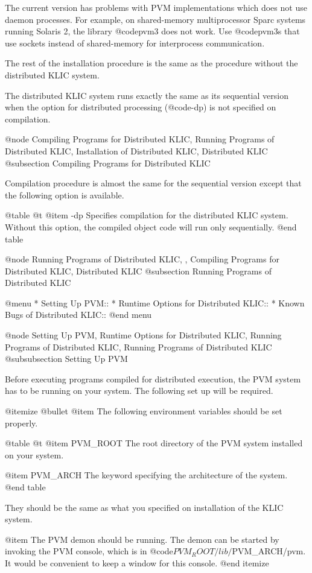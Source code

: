 {{{{The current version has problems with PVM implementations which does not
use daemon processes.  For example, on shared-memory multiprocessor
Sparc systems running Solaris 2, the library @code{pvm3} does not work.
Use @code{pvm3s} that use sockets instead of shared-memory for
interprocess communication.

The rest of the installation procedure is the same as the procedure
without the distributed KLIC system.

The distributed KLIC system runs exactly the same as its sequential
version when the option for distributed processing (@code{-dp}) is not
specified on compilation.

@node Compiling Programs for Distributed KLIC, Running Programs of Distributed KLIC, Installation of Distributed KLIC, Distributed KLIC
@subsection Compiling Programs for Distributed KLIC

Compilation procedure is almost the same for the sequential version
except that the following option is available.

@table @t
@item -dp
Specifies compilation for the distributed KLIC system.  Without this
option, the compiled object code will run only sequentially.
@end table

@node Running Programs of Distributed KLIC,  , Compiling Programs for Distributed KLIC, Distributed KLIC
@subsection Running Programs of Distributed KLIC

@menu
* Setting Up PVM::              
* Runtime Options for Distributed KLIC::  
* Known Bugs of Distributed KLIC::  
@end menu

@node Setting Up PVM, Runtime Options for Distributed KLIC, Running Programs of Distributed KLIC, Running Programs of Distributed KLIC
@subsubsection Setting Up PVM

Before executing programs compiled for distributed execution, the PVM
system has to be running on your system.  The following set up will be
required.

@itemize @bullet
@item
The following environment variables should be set properly.

@table @t
@item PVM_ROOT
The root directory of the PVM system installed on your system.

@item PVM_ARCH
The keyword specifying the architecture of the system.
@end table

They should be the same as what you specified on installation of the
KLIC system.

@item
The PVM demon should be running.  The demon can be started by invoking
the PVM console, which is in @code{$PVM_ROOT/lib/$PVM_ARCH/pvm}.  It
would be convenient to keep a window for this console.
@end itemize

}}}}
